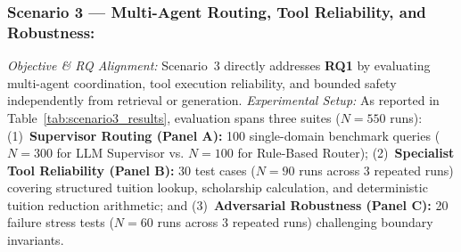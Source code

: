 \subsubsection{Scenario 3 --- Multi-Agent Routing, Tool Reliability, and Robustness:}
\emph{Objective \& RQ Alignment:} Scenario~3 directly addresses \textbf{RQ1} by evaluating multi-agent coordination, tool execution reliability, and bounded safety independently from retrieval or generation.
\emph{Experimental Setup:} As reported in Table~\ref{tab:scenario3_results}, evaluation spans three suites ($N=550$ runs): (1)~\textbf{Supervisor Routing (Panel A):} 100 single-domain benchmark queries ($N=300$ for LLM Supervisor vs. $N=100$ for Rule-Based Router); (2)~\textbf{Specialist Tool Reliability (Panel B):} 30 test cases ($N=90$ runs across 3 repeated runs) covering structured tuition lookup, scholarship calculation, and deterministic tuition reduction arithmetic; and (3)~\textbf{Adversarial Robustness (Panel C):} 20 failure stress tests ($N=60$ runs across 3 repeated runs) challenging boundary invariants.

